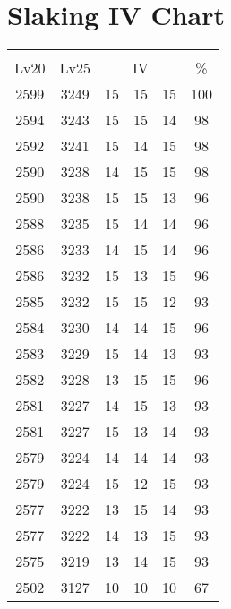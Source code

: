 \documentclass{article}%
\begin{document}
%
\normalsize%
\section{Slaking IV Chart}%
\label{sec:Slaking IV Chart}%
\renewcommand{\arraystretch}{1.5}%
\begin{tabular}{|c|c|c|c|c|c|}%
\hline%
\multicolumn{6}{|c|}{\textcolor{white}{ 
\linebreak{Slaking}
}%
\cellcolor{black}}\\%
\multicolumn{1}{|c}{Lv20}&\multicolumn{1}{c|}{Lv25}&\multicolumn{3}{c|}{IV}&\multicolumn{1}{|c|}{\%}\\%
\hline%
\rowcolor{color100}%
2599&3249&15&15&15&100\\%
\hline%
\rowcolor{color98}%
2594&3243&15&15&14&98\\%
\hline%
\rowcolor{color98}%
2592&3241&15&14&15&98\\%
\hline%
\rowcolor{color98}%
2590&3238&14&15&15&98\\%
\hline%
\rowcolor{color96}%
2590&3238&15&15&13&96\\%
\hline%
\rowcolor{color96}%
2588&3235&15&14&14&96\\%
\hline%
\rowcolor{color96}%
2586&3233&14&15&14&96\\%
\hline%
\rowcolor{color96}%
2586&3232&15&13&15&96\\%
\hline%
\rowcolor{color93}%
2585&3232&15&15&12&93\\%
\hline%
\rowcolor{color96}%
2584&3230&14&14&15&96\\%
\hline%
\rowcolor{color93}%
2583&3229&15&14&13&93\\%
\hline%
\rowcolor{color96}%
2582&3228&13&15&15&96\\%
\hline%
\rowcolor{color93}%
2581&3227&14&15&13&93\\%
\hline%
\rowcolor{color93}%
2581&3227&15&13&14&93\\%
\hline%
\rowcolor{color93}%
2579&3224&14&14&14&93\\%
\hline%
\rowcolor{color93}%
2579&3224&15&12&15&93\\%
\hline%
\rowcolor{color93}%
2577&3222&13&15&14&93\\%
\hline%
\rowcolor{color93}%
2577&3222&14&13&15&93\\%
\hline%
\rowcolor{color93}%
2575&3219&13&14&15&93\\%
\hline%
\rowcolor{color91}%
2502&3127&10&10&10&67\\%
\end{tabular}

%
\end{document}
